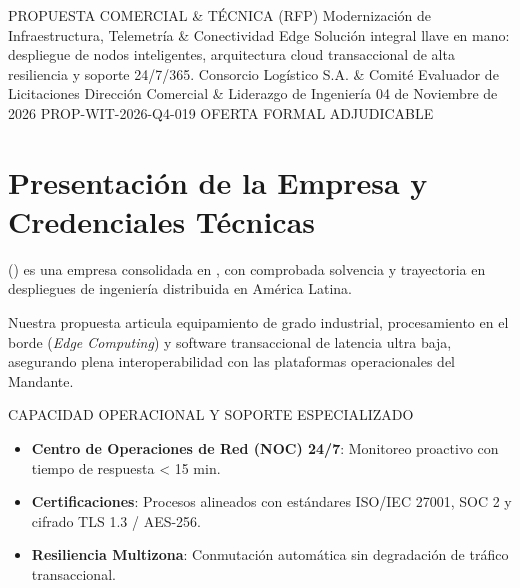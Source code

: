 \documentclass[11pt,letterpaper]{article}
\begin{document}
\makecorporatedarkcover%
  {PROPUESTA COMERCIAL \& T\'ECNICA (RFP)}%
  {Modernizaci\'on de Infraestructura, Telemetr\'ia \& Conectividad Edge}%
  {Soluci\'on integral llave en mano: despliegue de nodos inteligentes, arquitectura cloud transaccional de alta resiliencia y soporte 24/7/365.}%
  {Consorcio Log\'istico S.A. \& Comit\'e Evaluador de Licitaciones}%
  {Direcci\'on Comercial \& Liderazgo de Ingenier\'ia}%
  {04 de Noviembre de 2026}%
  {PROP-WIT-2026-Q4-019}%
  {OFERTA FORMAL ADJUDICABLE}


\section{Presentaci\'on de la Empresa y Credenciales T\'ecnicas}

\textbf{\corporatebrandlegal} (\textbf{\corporatebrandname}) es una empresa consolidada en \textit{\corporatebrandtagline}, con comprobada solvencia y trayectoria en despliegues de ingenier\'ia distribuida en Am\'erica Latina.

Nuestra propuesta articula equipamiento de grado industrial, procesamiento en el borde (\textit{Edge Computing}) y software transaccional de latencia ultra baja, asegurando plena interoperabilidad con las plataformas operacionales del Mandante.

\vspace{0.3em}

\begin{corpnote}{CAPACIDAD OPERACIONAL Y SOPORTE ESPECIALIZADO}
  \begin{itemize}[leftmargin=1.2em, itemsep=1pt, topsep=1pt]
    \item \textbf{Centro de Operaciones de Red (NOC) 24/7}: Monitoreo proactivo con tiempo de respuesta < 15 min.
    \item \textbf{Certificaciones}: Procesos alineados con est\'andares ISO/IEC 27001, SOC 2 y cifrado TLS 1.3 / AES-256.
    \item \textbf{Resiliencia Multizona}: Conmutaci\'on autom\'atica sin degradaci\'on de tr\'afico transaccional.
  \end{itemize}
\end{corpnote}
\end{document}
